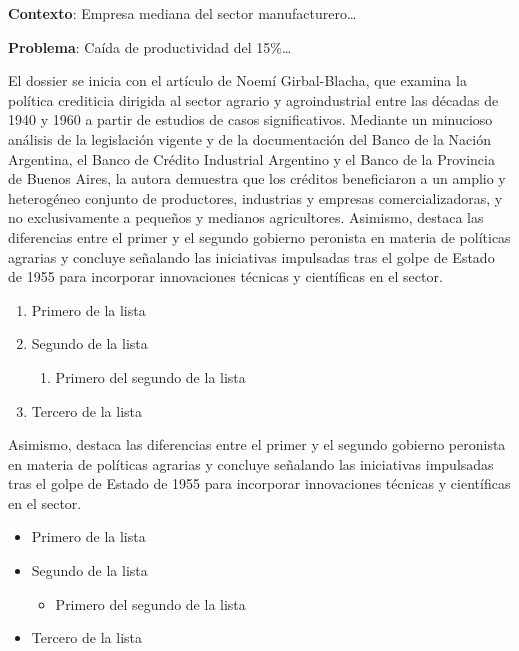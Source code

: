 \documentclass{article}
\begin{document}
\begin{tcolorbox}[colback=white,colframe=azulrevista,leftrule=3pt,rightrule=0pt,toprule=0pt,bottomrule=0pt,arc=0pt,left=8pt,right=4pt,top=3pt,bottom=3pt,before skip=4pt,after skip=4pt]
{\sffamily\small
\textbf{Contexto}: Empresa mediana del sector manufacturero…

\textbf{Problema}: Caída de productividad del 15\%…

}
\end{tcolorbox}

El dossier se inicia con el artículo de Noemí Girbal-Blacha, que examina la política crediticia dirigida al sector agrario y agroindustrial entre las décadas de 1940 y 1960 a partir de estudios de casos significativos. Mediante un minucioso análisis de la legislación vigente y de la documentación del Banco de la Nación Argentina, el Banco de Crédito Industrial Argentino y el Banco de la Provincia de Buenos Aires, la autora demuestra que los créditos beneficiaron a un amplio y heterogéneo conjunto de productores, industrias y empresas comercializadoras, y no exclusivamente a pequeños y medianos agricultores. Asimismo, destaca las diferencias entre el primer y el segundo gobierno peronista en materia de políticas agrarias y concluye señalando las iniciativas impulsadas tras el golpe de Estado de 1955 para incorporar innovaciones técnicas y científicas en el sector.

\begin{enumerate}
  \item Primero de la lista
  \item Segundo de la lista
\begin{enumerate}
  \item Primero del segundo de la lista
\end{enumerate}

  \item Tercero de la lista
\end{enumerate}

Asimismo, destaca las diferencias entre el primer y el segundo gobierno peronista en materia de políticas agrarias y concluye señalando las iniciativas impulsadas tras el golpe de Estado de 1955 para incorporar innovaciones técnicas y científicas en el sector.

\begin{itemize}
  \item Primero de la lista
  \item Segundo de la lista
\begin{itemize}
  \item Primero del segundo de la lista
\end{itemize}

  \item Tercero de la lista
\end{itemize}
\end{document}
